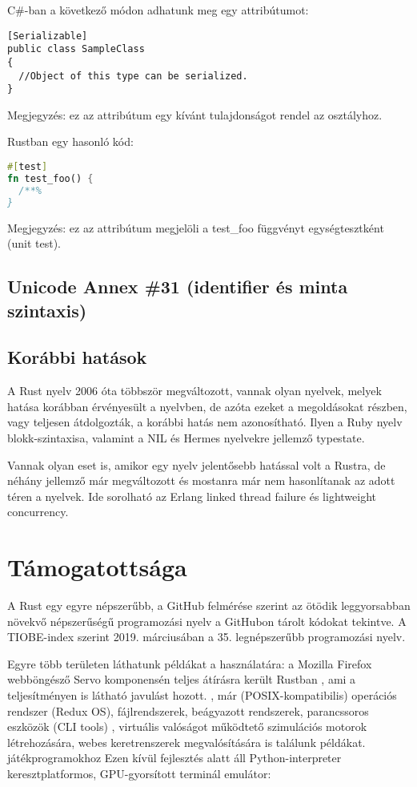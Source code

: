 C\#-ban a következő módon adhatunk meg egy attribútumot:
\begin{lstlisting}
[Serializable]
public class SampleClass
{
  //Object of this type can be serialized.
}
\end{lstlisting}
Megjegyzés: ez az attribútum egy kívánt tulajdonságot rendel az osztályhoz.

Rustban egy hasonló kód:
\begin{lstlisting}[language=Rust, style=boxed]
#[test]
fn test_foo() {
  /**%
}
\end{lstlisting}
Megjegyzés: ez az attribútum megjelöli a test\_foo függvényt egységtesztként (unit test).

\subsection{Unicode Annex \#31 (identifier és minta szintaxis)}

\subsection{Korábbi hatások}
A Rust nyelv 2006 óta többször megváltozott, vannak olyan nyelvek, melyek hatása korábban érvényesült a nyelvben, de azóta ezeket a megoldásokat részben, vagy teljesen átdolgozták, a korábbi hatás nem azonosítható. Ilyen a Ruby nyelv blokk-szintaxisa, valamint a NIL és Hermes nyelvekre jellemző typestate.

Vannak olyan eset is, amikor egy nyelv jelentősebb hatással volt a Rustra, de néhány jellemző már megváltozott és mostanra már nem hasonlítanak az adott téren a nyelvek. Ide sorolható az Erlang linked thread failure és lightweight concurrency.

\section{Támogatottsága}
A Rust egy egyre népszerűbb, a GitHub felmérése szerint %
az ötödik leggyorsabban növekvő népszerűségű programozási nyelv a GitHubon tárolt kódokat tekintve. A TIOBE-index szerint %
2019. márciusában a 35. legnépszerűbb programozási nyelv.

Egyre több területen láthatunk példákat a használatára: a Mozilla Firefox webböngésző Servo komponensén teljes átírásra került Rustban
, ami a teljesítményen is látható javulást hozott. %
, már (POSIX-kompatibilis) operációs rendszer (Redux OS), fájlrendszerek, beágyazott rendszerek, parancssoros eszközök (CLI tools) %
, virtuális valóságot működtető szimulációs motorok létrehozására, webes keretrenszerek megvalósítására is találunk példákat. %
játékprogramokhoz %
Ezen kívül fejlesztés alatt áll Python-interpreter %
keresztplatformos, GPU-gyorsított terminál emulátor: %
